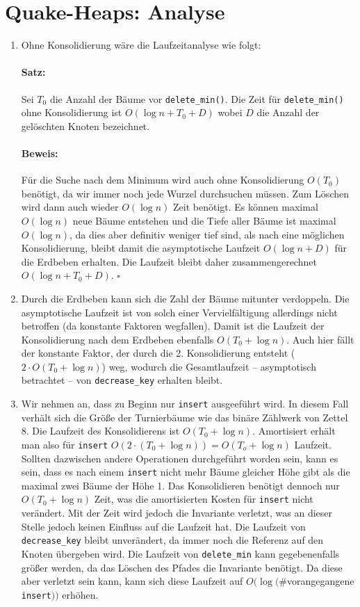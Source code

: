 \documentclass[a4paper,10pt]{article}
\begin{document}
\section{Quake-Heaps: Analyse}
\begin{enumerate}
\item   Ohne Konsolidierung wäre die Laufzeitanalyse wie folgt:
        \paragraph*{Satz:} Sei $T_0$ die Anzahl der Bäume vor \verb!delete_min()!. Die Zeit für \verb!delete_min()! ohne Konsolidierung ist $O(\log n + T_0 + D)$ wobei $D$ die Anzahl der gelöschten Knoten bezeichnet.
        \paragraph*{Beweis:} Für die Suche nach dem Minimum wird auch ohne Konsolidierung $O(T_0)$ benötigt, da wir immer noch jede Wurzel durchsuchen müssen.
        Zum Löschen wird dann auch wieder $O(\log n)$ Zeit benötigt.
        Es können maximal $O(\log n)$ neue Bäume entstehen und die Tiefe aller Bäume ist maximal $O(\log n)$, da dies aber definitiv weniger tief sind, als nach eine möglichen Konsolidierung, bleibt damit die asymptotische Laufzeit $O(\log n + D)$ für die Erdbeben erhalten.
        Die Laufzeit bleibt daher zusammengerechnet $O(\log n + T_0 + D)$. \hfill $\square$
\item   Durch die Erdbeben kann sich die Zahl der Bäume mitunter verdoppeln. 
        Die asymptotische Laufzeit ist von solch einer Vervielfältigung allerdings nicht betroffen (da konstante Faktoren wegfallen).
        Damit ist die Laufzeit der Konsolidierung nach dem Erdbeben ebenfalls $O(T_0 + \log n)$.
        Auch hier fällt der konstante Faktor, der durch die 2. Konsolidierung entsteht ($2 \cdot O(T_0 + \log n)$) weg, wodurch die Gesamtlaufzeit -- asymptotisch betrachtet -- von \verb!decrease_key! erhalten bleibt.
\item   Wir nehmen an, dass zu Beginn nur \verb!insert! ausgeeführt wird. In diesem Fall verhält sich die Größe der Turnierbäume wie das binäre Zählwerk von Zettel 8. Die Laufzeit des Konsolidierens ist $O(T_0 + \log n)$. Amortisiert erhält man also für \verb!insert! $O(2 \cdot (T_0 + \log n)) = O(T_o + \log n)$ Laufzeit. Sollten dazwischen andere Operationen durchgeführt worden sein, kann es sein, dass es nach einem \verb!insert! nicht mehr Bäume gleicher Höhe gibt als die maximal zwei Bäume der Höhe 1. Das Konsolidieren benötigt dennoch nur $O(T_0 + \log n)$ Zeit, was die amortisierten Kosten für \verb!insert! nicht verändert. Mit der Zeit wird jedoch die Invariante verletzt, was an dieser Stelle jedoch keinen Einfluss auf die Laufzeit hat. Die Laufzeit von \verb!decrease_key! bleibt unverändert, da immer noch die Referenz auf den Knoten übergeben wird. Die Laufzeit von \verb!delete_min! kann gegebenenfalls größer werden, da das Löschen des Pfades die Invariante benötigt. Da diese aber verletzt sein kann, kann sich diese Laufzeit auf $O(\log (\#$vorangegangene \verb!insert!$))$ erhöhen.
\end{enumerate}
\end{document}
